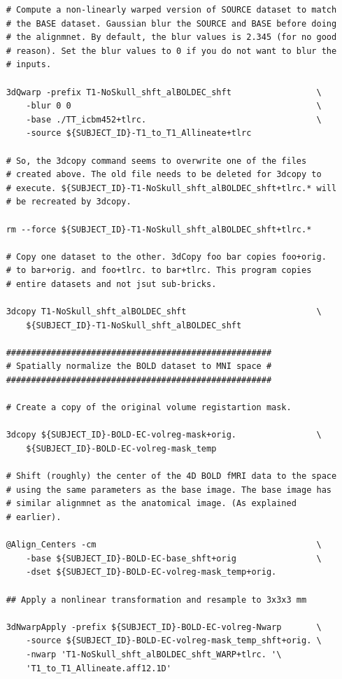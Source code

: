 \documentclass[12pt]{article}
\begin{document}
\begin{verbatim}
    # Compute a non-linearly warped version of SOURCE dataset to match
    # the BASE dataset. Gaussian blur the SOURCE and BASE before doing
    # the alignmnet. By default, the blur values is 2.345 (for no good
    # reason). Set the blur values to 0 if you do not want to blur the
    # inputs.

    3dQwarp -prefix T1-NoSkull_shft_alBOLDEC_shft                 \
        -blur 0 0                                                 \
        -base ./TT_icbm452+tlrc.                                  \
        -source ${SUBJECT_ID}-T1_to_T1_Allineate+tlrc

    # So, the 3dcopy command seems to overwrite one of the files
    # created above. The old file needs to be deleted for 3dcopy to
    # execute. ${SUBJECT_ID}-T1-NoSkull_shft_alBOLDEC_shft+tlrc.* will
    # be recreated by 3dcopy.

    rm --force ${SUBJECT_ID}-T1-NoSkull_shft_alBOLDEC_shft+tlrc.*

    # Copy one dataset to the other. 3dCopy foo bar copies foo+orig.
    # to bar+orig. and foo+tlrc. to bar+tlrc. This program copies
    # entire datasets and not jsut sub-bricks.

    3dcopy T1-NoSkull_shft_alBOLDEC_shft                          \
        ${SUBJECT_ID}-T1-NoSkull_shft_alBOLDEC_shft

    #####################################################
    # Spatially normalize the BOLD dataset to MNI space #
    #####################################################

    # Create a copy of the original volume registartion mask.

    3dcopy ${SUBJECT_ID}-BOLD-EC-volreg-mask+orig.                \
        ${SUBJECT_ID}-BOLD-EC-volreg-mask_temp

    # Shift (roughly) the center of the 4D BOLD fMRI data to the space
    # using the same parameters as the base image. The base image has
    # similar alignmnet as the anatomical image. (As explained
    # earlier).

    @Align_Centers -cm                                            \
        -base ${SUBJECT_ID}-BOLD-EC-base_shft+orig                \
        -dset ${SUBJECT_ID}-BOLD-EC-volreg-mask_temp+orig.

    ## Apply a nonlinear transformation and resample to 3x3x3 mm

    3dNwarpApply -prefix ${SUBJECT_ID}-BOLD-EC-volreg-Nwarp       \
        -source ${SUBJECT_ID}-BOLD-EC-volreg-mask_temp_shft+orig. \
        -nwarp 'T1-NoSkull_shft_alBOLDEC_shft_WARP+tlrc. '\
        'T1_to_T1_Allineate.aff12.1D'


\end{verbatim}
\end{document}
